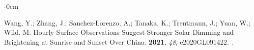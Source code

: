 \documentclass[applsci,article,accept,moreauthors,pdftex]{Definitions/mdpi}
\begin{document}
\begin{adjustwidth}{-\extralength}{0cm}
\begin{thebibliography}{999}
Wang, Y.; Zhang, J.; Sanchez‐Lorenzo, A.; Tanaka, K.; Trentmann, J.; Yuan,
  W.; Wild, M.
\newblock Hourly Surface Observations Suggest Stronger Solar Dimming and
  Brightening at Sunrise and Sunset Over China.
 {\bf 2021}, {\em 48}, e2020GL091422.
.

\end{thebibliography}

%

\PublishersNote{}
\end{adjustwidth}
\end{document}
